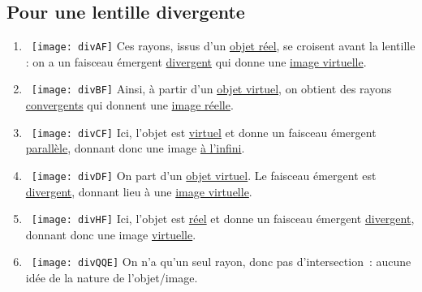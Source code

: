\documentclass[a4paper, 12pt, final, garamond]{book}
\begin{document}
\subsection{Pour une lentille divergente}
\begin{multicols}{2}
    \begin{enumerate}
        \item ~\smallbreak\texttt{[image: divAF]}
            Ces rayons, issus d'un \underline{objet réel}, se croisent avant la
        lentille : on a un faisceau émergent \underline{divergent} qui
        donne une \underline{image virtuelle}.
        \item ~\smallbreak\texttt{[image: divBF]}
            Ainsi, à partir d'un \underline{objet virtuel}, on obtient des rayons
            \underline{convergents} qui donnent une \underline{image réelle}.
            \columnbreak
        \item ~\smallbreak\texttt{[image: divCF]}
            Ici, l'objet est \underline{virtuel} et donne un faisceau émergent
            \underline{parallèle}, donnant donc une image \underline{à l'infini}.
        \item ~\smallbreak\texttt{[image: divDF]}
            On part d'un \underline{objet virtuel}. Le faisceau émergent est
            \underline{divergent}, donnant lieu à une \underline{image virtuelle}.
            \columnbreak
        \item ~\smallbreak\texttt{[image: divHF]}
            Ici, l'objet est \underline{réel} et donne un faisceau émergent
            \underline{divergent}, donnant donc une image \underline{virtuelle}.
        \item ~\smallbreak\texttt{[image: divQQE]}
            On n'a qu'un seul rayon, donc pas d'intersection~: aucune idée de la
            nature de l'objet/image.
    \end{enumerate}
\end{multicols}
\end{document}
